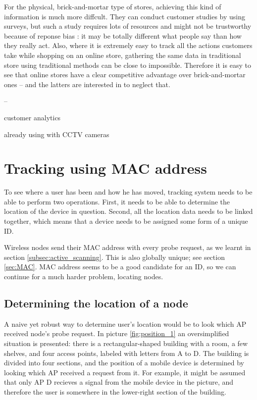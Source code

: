 \documentclass[12pt,a4paper,oneside,pdftex]{report}
\begin{document}
For the physical, brick-and-mortar type of stores, achieving this kind of information is much more diffcult. They can conduct customer studies by using surveys, but such a study requires lots of resources and might not be trustworthy because of reponse bias \cite{Furnham1986385}: it may be totally different what people say than how they really act. Also, where it is extremely easy to track all the actions customers take while shopping on an online store, gathering the same data in traditional store using traditional methods can be close to impossible. Therefore it is easy to see that online stores have a clear competitive advantage over brick-and-mortar ones -- and the latters are interested in to neglect that.

--

customer analytics


already using with CCTV cameras \cite{Newman2002253}

\section{Tracking using MAC address}
\label{sec:mac_tracking}

To see where a user has been and how he has moved, tracking system needs to be able to perform two operations. First, it needs to be able to determine the location of the device in question. Second, all the location data needs to be linked together, which means that a device needs to be assigned some form of a unique ID.

Wireless nodes send their MAC address with every probe request, as we learnt in section \ref{subsec:active_scanning}. This is also globally unique; see section \ref{sec:MAC}. MAC address seems to be a good candidate for an ID, so we can continue for a much harder problem, locating nodes.

\subsection{Determining the location of a node}
\label{sec:location}

A naive yet robust way to determine user's location would be to look which AP received node's probe request. In picture \ref{fig:position_1} an oversimplified situation is presented: there is a rectangular-shaped building with a room, a few shelves, and four access points, labeled with letters from A to D. The building is divided into four sections, and the position of a mobile device is determined by looking which AP received a request from it. For example, it might be assumed that only AP D recieves a signal from the mobile device in the picture, and therefore the user is somewhere in the lower-right section of the building.
\end{document}
